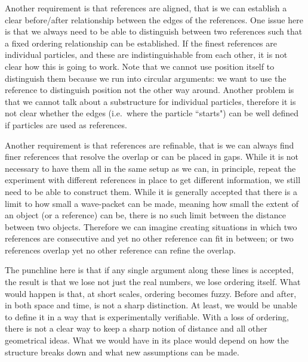 \documentclass[submission,copyright,creativecommons]{eptcs}
\begin{document}
Another requirement is that references are aligned, that is we can establish a clear before/after relationship between the edges of the references. One issue here is that we always need to be able to distinguish between two references such that a fixed ordering relationship can be established. If the finest references are individual particles, and these are indistinguishable from each other, it is not clear how this is going to work. Note that we cannot use position itself to distinguish them because we run into circular arguments: we want to use the reference to distinguish position not the other way around. Another problem is that we cannot talk about a substructure for individual particles, therefore it is not clear whether the edges (i.e.~where the particle ``starts") can be well defined if particles are used as references.

Another requirement is that references are refinable, that is we can always find finer references that resolve the overlap or can be placed in gaps. While it is not necessary to have them all in the same setup as we can, in principle, repeat the experiment with different references in place to get different information, we still need to be able to construct them. While it is generally accepted that there is a limit to how small a wave-packet can be made, meaning how small the extent of an object (or a reference) can be, there is no such limit between the distance between two objects. Therefore we can imagine creating situations in which two references are consecutive and yet no other reference can fit in between; or two references overlap yet no other reference can refine the overlap.

The punchline here is that if any single argument along these lines is accepted, the result is that we lose not just the real numbers, we lose ordering itself. What would happen is that, at short scales, ordering becomes fuzzy. Before and after, in both space and time, is not a sharp distinction. At least, we would be unable to define it in a way that is experimentally verifiable. With a loss of ordering, there is not a clear way to keep a sharp notion of distance and all other geometrical ideas. What we would have in its place would depend on how the structure breaks down and what new assumptions can be made.





\end{document}
